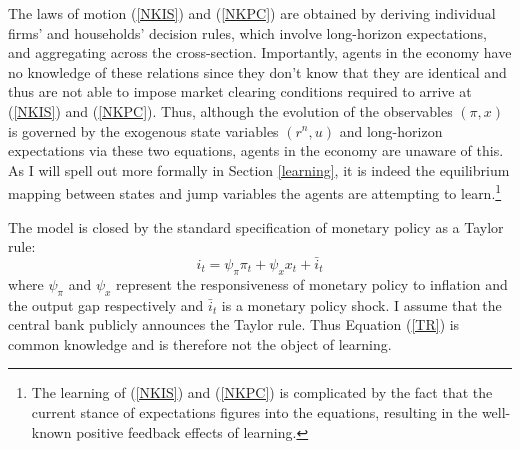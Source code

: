 \documentclass[11pt]{article}
\renewcommand{\[}{\begin{equation}}
\renewcommand{\]}{\end{equation}}
\begin{document}
The laws of motion (\ref{NKIS}) and (\ref{NKPC}) are obtained by deriving individual firms' and households' decision rules, which involve long-horizon expectations, and aggregating across the cross-section. Importantly, agents in the economy have no knowledge of these relations since they don't know that they are identical and thus are not able to impose market clearing conditions required to arrive at (\ref{NKIS}) and (\ref{NKPC}). Thus, although the evolution of the observables $(\pi,x)$ is governed by the exogenous state variables $(r^n, u)$ and long-horizon expectations via these two equations, agents in the economy are unaware of this. As I will spell out more formally in Section \ref{learning}, it is indeed the equilibrium mapping between states and jump variables the agents are attempting to learn.\footnote{The learning of (\ref{NKIS}) and (\ref{NKPC}) is complicated by the fact that the current stance of expectations figures into the equations, resulting in the well-known positive feedback effects of learning.} 

The model is closed by the standard specification of monetary policy as a Taylor rule:
\begin{equation}
i_t = \psi_{\pi}\pi_t + \psi_{x} x_t + \bar{i}_t  \label{TR}
\end{equation}
where $\psi_{\pi}$ and $\psi_{x}$ represent the responsiveness of monetary policy to inflation and the output gap respectively and $\bar{i}_t$ is a monetary policy shock. I assume that the central bank publicly announces the Taylor rule. Thus Equation (\ref{TR}) is common knowledge and is therefore not the object of learning. 
\end{document}
